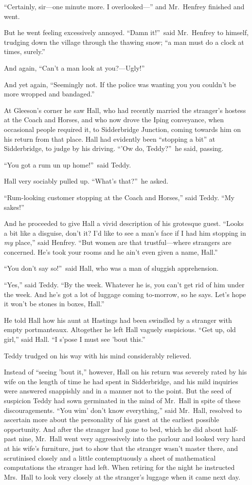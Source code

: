 “Certainly, sir—one minute more. I overlooked—” and Mr.\ Henfrey finished and went.

But he went feeling excessively annoyed. “Damn it!”\ said Mr.\ Henfrey to himself, trudging down the village through the thawing snow; “a man must do a clock at times, surely.”

And again, “Can’t a man look at you?—Ugly!”

And yet again, “Seemingly not. If the police was wanting you you couldn’t be more wropped and bandaged.”

At Gleeson’s corner he saw Hall, who had recently married the stranger’s hostess at the Coach and Horses, and who now drove the Iping conveyance, when occasional people required it, to Sidderbridge Junction, coming towards him on his return from that place. Hall had evidently been “stopping a bit” at Sidderbridge, to judge by his driving. “\kern1pt’Ow do, Teddy?”\ he said, passing.

“You got a rum un up home!”\ said Teddy.

Hall very sociably pulled up. “What’s that?”\ he asked.

“Rum-looking customer stopping at the Coach and Hor\-ses,” said Teddy. “My sakes!”

And he proceeded to give Hall a vivid description of his grotesque guest. “Looks a bit like a disguise, don’t it? I’d like to see a man’s face if I had him stopping in \emph{my} place,” said Henfrey. “But women are that trustful—where strangers are concerned. He’s took your rooms and he ain’t even given a name, Hall.”

“You don’t say so!”\ said Hall, who was a man of sluggish apprehension.

“Yes,” said Teddy. “By the week. Whatever he is, you can’t get rid of him under the week. And he’s got a lot of luggage coming to-morrow, so he says. Let’s hope it won’t be stones in boxes, Hall.”

He told Hall how his aunt at Hastings had been swindled by a stranger with empty portmanteaux. Altogether he left Hall vaguely suspicious. “Get up, old girl,” said Hall. “I s’pose I must see ’bout this.”

Teddy trudged on his way with his mind considerably relieved.

Instead of “seeing ’bout it,” however, Hall on his return was severely rated by his wife on the length of time he had spent in Sidderbridge, and his mild inquiries were answered snappishly and in a manner not to the point. But the seed of suspicion Teddy had sown germinated in the mind of Mr.\ Hall in spite of these discouragements. “You wim’ don’t know everything,” said Mr.\ Hall, resolved to ascertain more about the personality of his guest at the earliest possible opportunity. And after the stranger had gone to bed, which he did about half-past nine, Mr.\ Hall went very aggressively into the parlour and looked very hard at his wife’s furniture, just to show that the stranger wasn’t master there, and scrutinised closely and a little contemptuously a sheet of mathematical computations the stranger had left. When retiring for the night he instructed Mrs.\ Hall to look very closely at the stranger’s luggage when it came next day.


